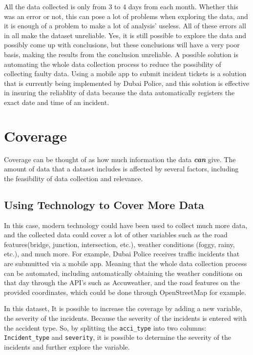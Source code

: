 \documentclass[
]{book}
\begin{document}
All the data collected is only from 3 to 4 days from each month. Whether this was an error or not, this can pose a lot of problems when exploring the data, and it is enough of a problem to make a lot of analysis' useless. All of these errors all in all make the dataset unreliable. Yes, it is still possible to explore the data and possibly come up with conclusions, but these conclusions will have a very poor basis, making the results from the conclusion unreliable. A possible solution is automating the whole data collection process to reduce the possibility of collecting faulty data. Using a mobile app to submit incident tickets is a solution that is currently being implemented by Dubai Police, and this solution is effective in insuring the reliablity of data because the data automatically registers the exact date and time of an incident.

\hypertarget{coverage}{%
\section{Coverage}\label{coverage}}

Coverage can be thought of as how much information the data \textbf{\emph{can}} give. The amount of data that a dataset includes is affected by several factors, including the feasibility of data collection and relevance.

\hypertarget{using-technology-to-cover-more-data}{%
\subsection{Using Technology to Cover More Data}\label{using-technology-to-cover-more-data}}

In this case, modern technology could have been used to collect much more data, and the collected data could cover a lot of other variables such as the road features(bridge, junction, intersection, etc.), weather conditions (foggy, rainy, etc.), and much more. For example, Dubai Police receives traffic incidents that are submuitted via a mobile app. Meaning that the whole data collection process can be automated, including automatically obtaining the weather conditions on that day through the API's such as Accuweather, and the road features on the provided coordinates, which could be done through OpenStreetMap for example.

In this dataset, It is possible to increase the coverage by adding a new variable, the severity of the incidents. Because the severity of the incidents is entered with the accident type. So, by splitting the \texttt{acci\_type} into two columns: \texttt{Incident\_type} and \texttt{severity}, it is possible to determine the severity of the incidents and further explore the variable.
\end{document}
